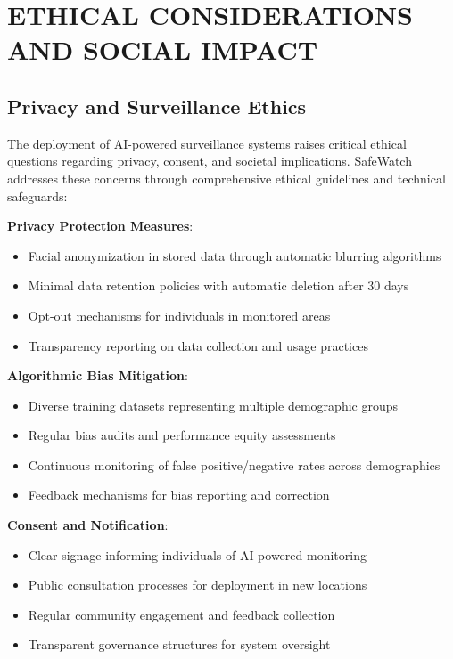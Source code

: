 \documentclass[12pt,a4paper]{article}
\begin{document}
\newpage
\section{ETHICAL CONSIDERATIONS AND SOCIAL IMPACT}

\subsection{Privacy and Surveillance Ethics}

The deployment of AI-powered surveillance systems raises critical ethical questions regarding privacy, consent, and societal implications. SafeWatch addresses these concerns through comprehensive ethical guidelines and technical safeguards:

\textbf{Privacy Protection Measures}:
\begin{itemize}
    \item Facial anonymization in stored data through automatic blurring algorithms
    \item Minimal data retention policies with automatic deletion after 30 days
    \item Opt-out mechanisms for individuals in monitored areas
    \item Transparency reporting on data collection and usage practices
\end{itemize}

\textbf{Algorithmic Bias Mitigation}:
\begin{itemize}
    \item Diverse training datasets representing multiple demographic groups
    \item Regular bias audits and performance equity assessments
    \item Continuous monitoring of false positive/negative rates across demographics
    \item Feedback mechanisms for bias reporting and correction
\end{itemize}

\textbf{Consent and Notification}:
\begin{itemize}
    \item Clear signage informing individuals of AI-powered monitoring
    \item Public consultation processes for deployment in new locations
    \item Regular community engagement and feedback collection
    \item Transparent governance structures for system oversight
\end{itemize}
\end{document}
